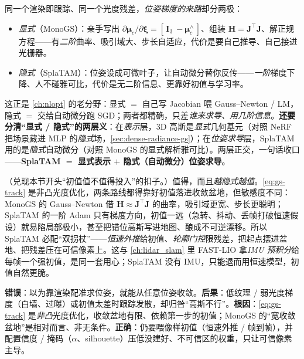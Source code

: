 \begin{insight}
同一个渲染即跟踪、同一个光度残差，\emph{位姿梯度的来路}却分两极：
\begin{itemize}
  \item \emph{显式}（MonoGS）：亲手写出 $\partial\boldsymbol\mu_c/\partial\boldsymbol\xi=[\,\mathbf I_3\ -\boldsymbol\mu_c^\wedge\,]$、组装 $\mathbf H=\mathbf J^\top\mathbf J$、解正规方程——有\emph{二阶}曲率、吸引域大、步长自适应，代价是要自己推导、自己接进光栅器。
  \item \emph{隐式}（SplaTAM）：位姿设成可微叶子，让自动微分替你反传——\emph{一阶}梯度下降、人不碰雅可比，代价是无二阶信息、更靠好初值与学习率。
\end{itemize}
这正是 \cref{ch:nlopt} 的老分野：显式 $=$ 自己写 Jacobian 喂 Gauss--Newton / LM，隐式 $=$ 交给自动微分跑 SGD；两者都精确，只差\emph{谁来求导、用几阶信息}。\textbf{还要分清“显式 / 隐式”的两层义}：在\emph{表示}层，3D 高斯是\emph{显式}几何基元（对照 NeRF 把场景藏进 MLP 的\emph{隐式}场，\cref{sec:dense-radiance-gs}）；在\emph{位姿求导}层，SplaTAM 用的是\emph{隐式}自动微分（对照 MonoGS 的显式解析雅可比）。两层正交，一句话收口——\textbf{SplaTAM $=$ 显式表示 $+$ 隐式（自动微分）位姿求导}。
\end{insight}

\begin{note}
（兑现本节开头“初值值不值得投入”的扣子。）值得，而且\emph{越隐式越值}。\cref{eq:gs-track} 是非凸光度优化，两条路线都得靠好初值落进收敛盆地，但敏感度不同：MonoGS 的 Gauss--Newton 借 $\mathbf H\approx\mathbf J^\top\mathbf J$ 的曲率，吸引域更宽、步长更聪明；SplaTAM 的一阶 Adam 只有梯度方向，初值一远（急转、抖动、丢帧打破恒速假设）就易陷局部极小，甚至把错位高斯写进地图、酿成不可逆漂移。所以 SplaTAM 必配“双拐杖”——\emph{恒速外推}给初值、\emph{轮廓门控}限残差，把起点摆进盆地、把残差压在可信像素上。这与 \cref{ch:lidar_slam} 里 FAST-LIO 拿\emph{IMU 预积分}给每帧一个强初值，是同一套用心；SplaTAM 没有 IMU，只能退而用恒速模型，初值自然更脆。
\end{note}

\begin{pitfall}
\textbf{错误}：以为靠渲染配准求位姿，就能从任意位姿收敛。\textbf{后果}：低纹理 / 弱光度梯度（白墙、过曝）或初值太差时跟踪发散，却归咎“高斯不行”。\textbf{根因}：\cref{eq:gs-track} 是\emph{非凸}光度优化，收敛盆地有限、依赖第一步的初值；MonoGS 的“宽收敛盆地”是相对而言、非无条件。\textbf{正确}：仍要喂像样初值（恒速外推 / 帧到帧），并配置信度 / 掩码（$\alpha$、silhouette）压低没建好、不可信区的权重，只让可信像素主导。
\end{pitfall}

